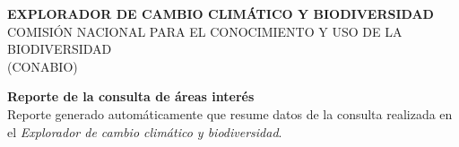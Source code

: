 \begin{titlepage}
\begin{center}
\begin{table}[h!]
\begin{tabular}{ccccc}
			\end{tabular}
	\end{table}
	\vspace{2.5cm}
	\huge{\textbf{EXPLORADOR DE CAMBIO CLIM\'ATICO Y BIODIVERSIDAD }}\\
	\large{COMISI\'ON NACIONAL PARA EL CONOCIMIENTO Y USO DE LA BIODIVERSIDAD \\
	(CONABIO)} \\

	\vspace{2.5cm}

	\textbf{Reporte de la consulta de \'areas inter\'es} \\
	Reporte generado autom\'aticamente que resume datos de la consulta realizada en
	el \emph{Explorador de cambio clim\'atico y biodiversidad}.
	\vspace{2cm}

\end{center}










\end{titlepage}

